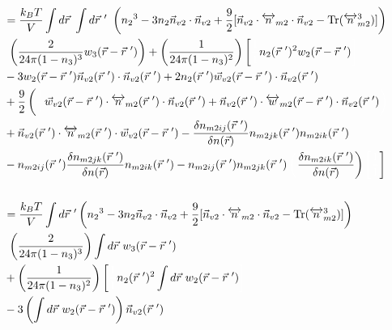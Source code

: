 \documentclass[double,12pt]{beavtex}
\begin{document}
\begin{align}   %
&=\frac{k_BT}{V}\int d\vec r~\int d\vec r~'~ \left( {n_2}^3-3n_2
    \vec{n}_{v2}\cdot\vec{n}_{v2} 
     +\frac{9}{2}[\vec{n}_{v2}\cdot{\overleftrightarrow{n}_{m2}}\cdot{
     \vec{n}_{v2}}-\operatorname{Tr}({\overleftrightarrow{n}^3_{m2}})]
     \right) \nonumber\\
     &~\left(\frac{2}{24\pi(1-n_3)^3} w_3(\vec r-\vec r~')
     \right) 
     + \left(\frac{1}{24\pi(1-n_3)^2}\right)\left[\color{white}\frac{1}{1}
     \color{black}n_2(\vec r~')^2
     w_2(\vec r-\vec r~') \color{white}\right] \nonumber\\
     &- 3w_2(\vec r-\vec r~')\vec n_{v2}
     (\vec r~') \cdot \vec n_{v2}(\vec r~') + 2n_2(\vec r~')
     \vec w_{v2}(\vec r-\vec r~')\cdot \vec n_{v2}(\vec r~') \nonumber \\
     &+\frac{9}{2}\left(\color{white}\frac{1}{1}\color{black}\vec w_{v2}
     (\vec r-\vec r~')
     \cdot \overleftrightarrow n_{m2}(\vec r~')\cdot \vec n_{v2}( \vec r~')
     +\vec n_{v2}(\vec r~')\cdot \overleftrightarrow w_{m2}(\vec r-\vec r~')
     \cdot \vec n_{v2}( \vec r~')\color{white}\right) \nonumber\\
     &+ \vec n_{v2}(\vec r~')\cdot \overleftrightarrow n_{m2}(\vec r~') 
     \cdot \vec w_{v2}(\vec r-\vec r~')
     -\frac{\delta n_{m2ij}(\vec r~')}{\delta n(\vec r)}n_{m2jk}(\vec r~')
     n_{m2ik}(\vec r~') \nonumber \\     
     &-\color{black}n_{m2ij}(\vec r~')\frac{\delta n_{m2jk}(\vec r~')}
     {\delta n(\vec r)}n_{m2ik}(\vec r~') - n_{m2ij}(\vec r~')n_{m2jk}
     (\vec r~')\color{white}\left(\color{black}\frac{\delta n_{m2ik}(\vec r~')}
     {\delta n(\vec r)}\right)
     \color{white}\left[\frac{1}{1}\color{black}\right]   \\ \nonumber \\
%
&=\frac{k_BT}{V}\int d\vec r~' \left( {n_2}^3-3n_2
    \vec{n}_{v2}\cdot\vec{n}_{v2} 
     +\frac{9}{2}[\vec{n}_{v2}\cdot{\overleftrightarrow{n}_{m2}}\cdot{
     \vec{n}_{v2}}-\operatorname{Tr}({\overleftrightarrow{n}^3_{m2}})]
     \right) \nonumber\\
     &~\left(\frac{2}{24\pi(1-n_3)^3}\right) \int d\vec r~ w_3(\vec r
     -\vec r~') \nonumber\\
     &+\left(\frac{1}{24\pi(1-n_3)^2}\right)\left[
     \color{white}\frac{1}{1}\color{black}n_2(\vec r~')^2
     \int d\vec r~ w_2(\vec r-\vec r~')
     \color{white}\right]\nonumber\\
     &- 3\left(\int d\vec r ~w_2(\vec r-\vec r~')\right)\vec n_{v2}(\vec r~')

\end{align}
\end{document}
